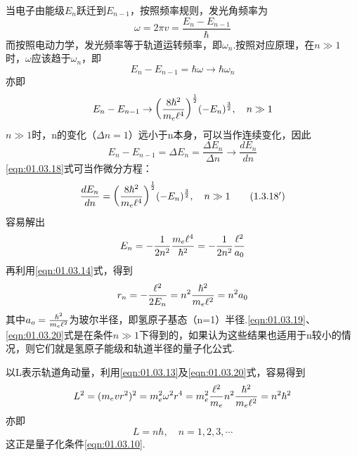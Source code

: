 当电子由能级$E_{n}$跃迁到$E_{n-1}$，按照频率规则，发光角频率为
\begin{equation}\label{eqn:01.03.16}
	\omega=2\pi v=\frac{E_{n}-E_{n-1}}{\hbar}
\end{equation}
而按照电动力学，发光频率等于轨道运转频率，即$\omega_{n}$.按照对应原理，在$n\gg 1$时，$\omega$应该趋于$\omega_{n}$，即
\begin{equation}\label{eqn:01.03.17}
	E_{n}- E_{n-1}=\hbar\omega\rightarrow\hbar\omega_{n}
\end{equation}
亦即
\begin{equation}\label{eqn:01.03.18}
	E_{n}- E_{n-1}\rightarrow \bigg(\frac{8\hbar^{2}}{m_{e}\ell^{4}}\bigg)^{\frac{1}{2}} (-E_{n})^{\frac{3}{2}},\quad n\gg 1
\end{equation}
$n\gg 1$时，n的变化（$\Delta n=1$）远小于n本身，可以当作连续变化，因此
\begin{equation*}
	E_{n}- E_{n-1}=\Delta E_{n}
	=\frac{\Delta E_{n}}{\Delta n}\rightarrow\frac{dE_{n}}{dn}
\end{equation*}
\eqref{eqn:01.03.18}式可当作微分方程：
\begin{equation*}\label{eqn:01.03.18'}
	 \frac{dE_{n}}{dn}=
	 \bigg(\frac{8\hbar^{2}}{m_{e}\e^{4}}\bigg)^{\frac{1}{2}}(-E_{n})^{\frac{3}{2}},
	 \quad n\gg1		\tag{$1.3.18^{\prime}$}
\end{equation*}
容易解出
\begin{equation}\label{eqn:01.03.19}
	E_{n}=-\frac{1}{2n^{2}}\frac{m_{e}\ell^{4}}{\hbar^{2}}=-\frac{1}{2n^{2}}\frac{\ell^{2}}{a_{0}}
\end{equation}
再利用\eqref{eqn:01.03.14}式，得到
\begin{equation}\label{eqn:01.03.20}
	r_{n}=-\frac{\ell^{2}}{2E_{n}}=n^{2}\frac{\hbar^{2}}{m_{e}\ell^{2}}=n^{2}a_{0}
\end{equation}
其中$a_{o}=\frac{\hbar^{2}}{m_{e}\ell^{2}}$为玻尔半径，即氢原子基态（n=1）半径.\eqref{eqn:01.03.19}、\eqref{eqn:01.03.20}式是在条件$n\gg 1$下得到的，如果认为这些结果也适用于n较小的情况，则它们就是氢原子能级和轨道半径的量子化公式.

以L表示轨道角动量，利用\eqref{eqn:01.03.13}及\eqref{eqn:01.03.20}式，容易得到
\begin{equation*}
	L^{2}=(m_{e}vr^{2})^{2}=m_{e}^{2}\omega^{2}r^{4}=m_{e}^{2}\frac{\ell^{2}}{m_{e}}n^{2}\frac{\hbar^{2}}{m_{e}\ell^{2}}=n^{2}\hbar^{2}
\end{equation*}
亦即
\begin{equation*}
	L=n\hbar,\quad n=1,2,3,\cdots
\end{equation*}
这正是量子化条件\eqref{eqn:01.03.10}.

